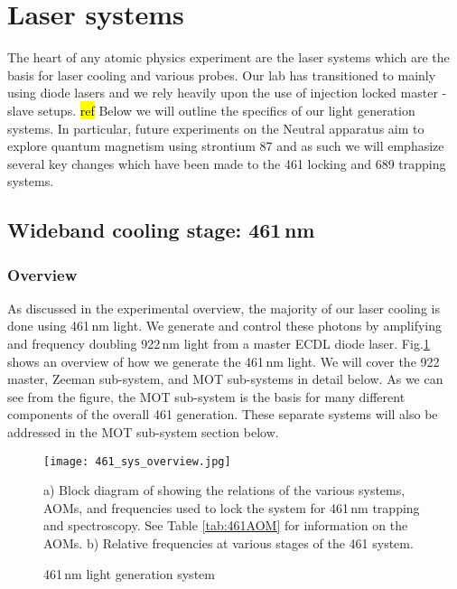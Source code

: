 \section{Laser systems}\label{sec:laser_systems}

The heart of any atomic physics experiment are the laser systems which are the basis for laser cooling and various probes.
Our lab has transitioned to mainly using diode lasers and we rely heavily upon the use of injection locked master - slave setups. \hl{ref}
Below we will outline the specifics of our light generation systems.
In particular, future experiments on the Neutral apparatus aim to explore quantum magnetism using strontium 87 and as such we will emphasize several key changes which have been made to the 461 locking and 689 trapping systems.

\subsection{Wideband cooling stage: 461\,nm}
\label{ssec:461sys}

\subsubsection{Overview}
As discussed in the experimental overview, the majority of our laser cooling is done using 461\,nm light. 
We generate and control these photons by amplifying and frequency doubling 922\,nm light from a master ECDL diode laser. 
Fig.\ref{fig:461blockSys} shows an overview of how we generate the 461\,nm light. 
We will cover the 922 master, Zeeman sub-system, and MOT sub-systems in detail below.
As we can see from the figure, the MOT sub-system is the basis for many different components of the overall 461 generation.
These separate systems will also be addressed in the MOT sub-system section below.
	\begin{figure}
		\centerline{
		\texttt{[image: 461\_sys\_overview.jpg]}}
		\caption{461\,nm light generation system}{a) Block diagram of showing the relations of the various systems, AOMs, and frequencies used to lock the system for 461\,nm trapping and spectroscopy. See Table \ref{tab:461AOM} for information on the AOMs. b) Relative frequencies at various stages of the 461 system.}
		\label{fig:461blockSys}
	\end{figure} 

